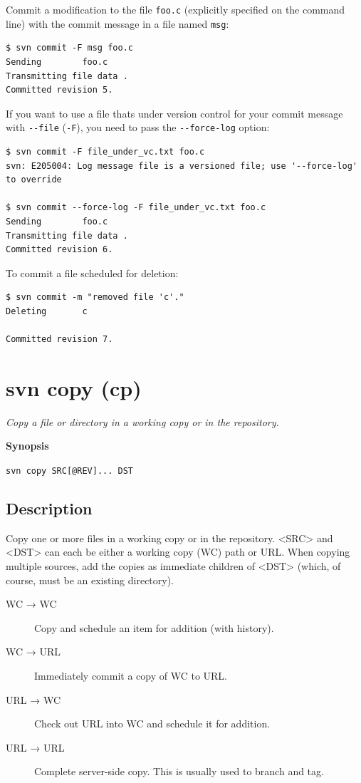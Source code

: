 Commit a modification to the file \texttt{foo.c} (explicitly specified
on the command line) with the commit message in a file named
\texttt{msg}:

\begin{verbatim}
$ svn commit -F msg foo.c
Sending        foo.c
Transmitting file data .
Committed revision 5.
\end{verbatim}

If you want to use a file that\textquotesingle s under version control
for your commit message with \texttt{-\/-file} (\texttt{-F}), you need
to pass the \texttt{-\/-force-log} option:

\begin{verbatim}
$ svn commit -F file_under_vc.txt foo.c
svn: E205004: Log message file is a versioned file; use '--force-log' to override

$ svn commit --force-log -F file_under_vc.txt foo.c
Sending        foo.c
Transmitting file data .
Committed revision 6.
\end{verbatim}

To commit a file scheduled for deletion:

\begin{verbatim}
$ svn commit -m "removed file 'c'."
Deleting       c

Committed revision 7.
\end{verbatim}

\section{svn copy (cp)}\label{svn.ref.svn.c.copy}

\emph{Copy a file or directory in a working copy or in the repository.}

\textbf{Synopsis}

\texttt{svn\ copy\ SRC{[}@REV{]}...\ DST}

\subsection{Description}

Copy one or more files in a working copy or in the repository.
\textless SRC\textgreater{} and \textless DST\textgreater{} can each be
either a working copy (WC) path or URL. When copying multiple sources,
add the copies as immediate children of \textless DST\textgreater{}
(which, of course, must be an existing directory).

\begin{description}
\item[WC → WC]
Copy and schedule an item for addition (with history).
\item[WC → URL]
Immediately commit a copy of WC to URL.
\item[URL → WC]
Check out URL into WC and schedule it for addition.
\item[URL → URL]
Complete server-side copy. This is usually used to branch and tag.
\end{description}

